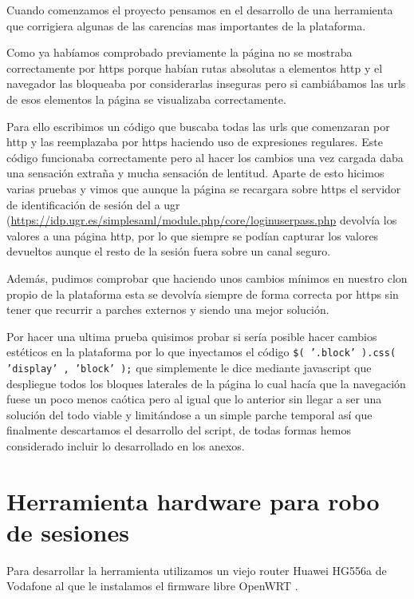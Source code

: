 Cuando comenzamos el proyecto pensamos en el desarrollo de una herramienta que corrigiera algunas de las carencias mas importantes de la plataforma. 

\bigskip
Como ya habíamos comprobado previamente la página no se mostraba correctamente por https porque habían rutas absolutas a elementos http y el navegador las bloqueaba por considerarlas inseguras pero si cambiábamos las urls de esos elementos la página se visualizaba correctamente.

\bigskip
Para ello escribimos un código que buscaba todas las urls que comenzaran por http y las reemplazaba por https haciendo uso de expresiones regulares. Este código funcionaba correctamente pero al hacer los cambios una vez cargada daba una sensación extraña y mucha sensación de lentitud. Aparte de esto hicimos varias pruebas y vimos que aunque la página se recargara sobre https el servidor de identificación de sesión del a ugr (\url{https://idp.ugr.es/simplesaml/module.php/core/loginuserpass.php} devolvía los valores a una página http, por lo que siempre se podían capturar los valores devueltos aunque el resto de la sesión fuera sobre un canal seguro. 

\bigskip
Además, pudimos comprobar que haciendo unos cambios mínimos en nuestro clon propio de la plataforma esta se devolvía siempre de forma correcta por https sin tener que recurrir a parches externos y siendo una mejor solución.

\bigskip
Por hacer una ultima prueba quisimos probar si sería posible hacer cambios estéticos en la plataforma por lo que inyectamos el código \texttt{\$( '.block' ).css( 'display' , 'block' );} que simplemente le dice mediante javascript que despliegue todos los bloques laterales de la página lo cual hacía que la navegación fuese un poco menos caótica pero al igual que lo anterior sin llegar a ser una solución del todo viable y limitándose a un simple parche temporal así que finalmente descartamos el desarrollo del script, de todas formas hemos considerado incluir lo desarrollado en los anexos.


\section{Herramienta hardware para robo de sesiones}

Para desarrollar la herramienta utilizamos un viejo router Huawei HG556a de Vodafone al que le instalamos el firmware libre OpenWRT \cite{openwrt}. 

